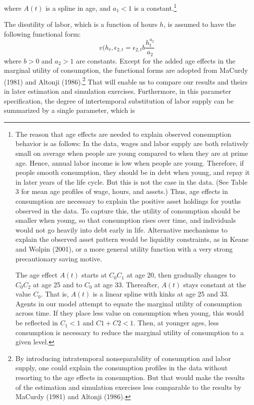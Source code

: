 \documentclass{article}
\begin{document}
    where $A(t)$ is a spline in age, and $a_1<1$ is a constant.\footnote[4]{The reason that age effects are needed to explain observed consumption behavior is as follows: In the data, wages and labor supply are both relatively small on average when people are young compared to when they are at prime age. Hence, annual labor income is low when people are young. Therefore, if people smooth consumption, they should be in debt when young, and repay it in later years of the life cycle. But this is not the case in the data. (See Table 3 for mean age profiles of wage, hours, and assets.) Thus, age effects in consumption are necessary to explain the positive asset holdings for youths observed in the data. To capture this, the utility of consumption should be smaller when young, so that consumption rises over time, and individuals would not go heavily into debt early in life. Alternative mechanisms to explain the observed asset pattern would be liquidity constraints, as in Keane and Wolpin (2001), or a more general utility function with a very strong precautionary saving motive. \par
The age effect $A(t)$ starts at $C_0 C_1$ at age 20, then gradually changes to $C_0 C_2$ at age 25 and to $C_0$ at age 33. Thereafter, $A(t)$ stays constant at the value $C_0$. That is, $A(t)$ is a linear spline with kinks at age 25 and 33. Agents in our model attempt to equate the marginal utility of consumption across time. If they place less value on consumption when young, this would be reflected in $C_1 < 1$ and $C1 + C2 < 1$. Then, at younger ages, less consumption is necessary to reduce the marginal utility of consumption to a given level.} \par
The disutility of labor, which is a function of hours $h$, is assumed to have the following functional form:
\begin{equation} \tag{6}
  v(h_t, \epsilon_{2,t} =  \epsilon_{2,t} b \dfrac{h_t^{a_2}}{a_2}
\end{equation}
where $b > 0$ and $a_2 > 1$ are constants. Except for the added age effects in the marginal utility of consumption, the functional forms are adopted from MaCurdy (1981) and Altonji (1986).\footnote[5]{ By introducing intratemporal nonseparability of consumption and labor supply, one could explain the consumption profiles in the data without resorting to the age effects in consumption. But that would make the results of the estimation and simulation exercises less comparable to the results by MaCurdy (1981) and Altonji (1986).} That will enable us to compare our results and theirs in later estimation and simulation exercises. Furthermore, in this parameter specification, the degree of intertemporal substitution of labor supply can be summarized by a single parameter, which is
\end{document}
